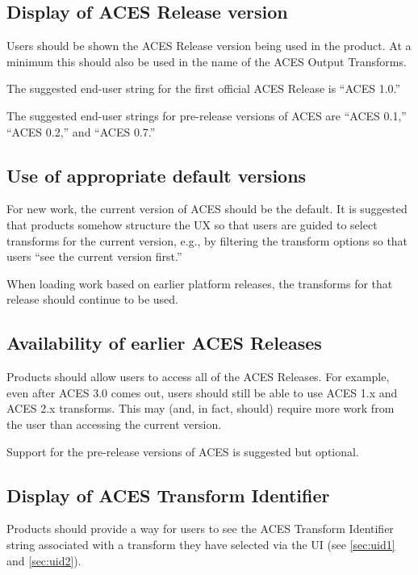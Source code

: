 \subsection{Display of ACES Release version}
Users should be shown the ACES Release version being used in the product. At a minimum this should also be used in the name of the ACES Output Transforms.

The suggested end-user string for the first official ACES Release is ``ACES 1.0.''

The suggested end-user strings for pre-release versions of ACES are ``ACES 0.1,'' ``ACES 0.2,'' and ``ACES 0.7.''

\subsection{Use of appropriate default versions}
For new work, the current version of ACES should be the default. It is suggested that products somehow structure the UX so that users are guided to select transforms for the current version, e.g., by filtering the transform options so that users ``see the current version first.'' 

When loading work based on earlier platform releases, the transforms for that release should continue to be used.

\subsection{Availability of earlier ACES Releases}
Products should allow users to access all of the ACES Releases. For example, even after ACES 3.0 comes out, users should still be able to use ACES 1.x and ACES 2.x transforms. This may (and, in fact, should) require more work from the user than accessing the current version.

Support for the pre-release versions of ACES is suggested but optional.

\subsection{Display of ACES Transform Identifier}
Products should provide a way for users to see the ACES Transform Identifier string associated with a transform they have selected via the UI (see \autoref{sec:uid1} and \autoref{sec:uid2}).